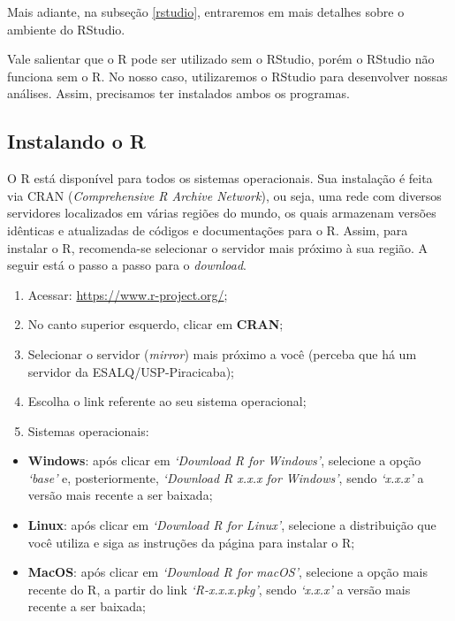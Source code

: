 \documentclass[
  brazilian,
]{book}
\begin{document}
Mais adiante, na subseção \ref{rstudio}, entraremos em mais detalhes sobre o ambiente do RStudio.

Vale salientar que o R pode ser utilizado sem o RStudio, porém o RStudio não funciona sem o R. No nosso caso, utilizaremos o RStudio para desenvolver nossas análises. Assim, precisamos ter instalados ambos os programas.

\hypertarget{instalando-o-r}{%
\subsection{Instalando o R}\label{instalando-o-r}}

O R está disponível para todos os sistemas operacionais. Sua instalação é feita via CRAN (\emph{Comprehensive R Archive Network}), ou seja, uma rede com diversos servidores localizados em várias regiões do mundo, os quais armazenam versões idênticas e atualizadas de códigos e documentações para o R. Assim, para instalar o R, recomenda-se selecionar o servidor mais próximo à sua região. A seguir está o passo a passo para o \emph{download}.

\begin{enumerate}
\def\labelenumi{\arabic{enumi}.}
\item
  Acessar: \url{https://www.r-project.org/};
\item
  No canto superior esquerdo, clicar em \textbf{CRAN};
\item
  Selecionar o servidor (\emph{mirror}) mais próximo a você (perceba que há um servidor da ESALQ/USP-Piracicaba);
\item
  Escolha o link referente ao seu sistema operacional;
\item
  Sistemas operacionais:
\end{enumerate}

\begin{itemize}
\item
  \textbf{Windows}: após clicar em \emph{`Download R for Windows'}, selecione a opção \emph{`base'} e, posteriormente, \emph{`Download R x.x.x for Windows'}, sendo \emph{`x.x.x'} a versão mais recente a ser baixada;
\item
  \textbf{Linux}: após clicar em \emph{`Download R for Linux'}, selecione a distribuição que você utiliza e siga as instruções da página para instalar o R;
\item
  \textbf{MacOS}: após clicar em \emph{`Download R for macOS'}, selecione a opção mais recente do R, a partir do link \emph{`R-x.x.x.pkg'}, sendo \emph{`x.x.x'} a versão mais recente a ser baixada;
\end{itemize}
\end{document}
